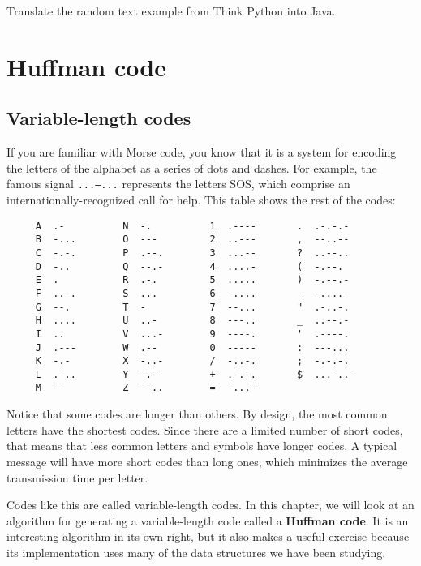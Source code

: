 Translate the random text example from Think Python into Java.


\chapter{Huffman code}
\label{huffman}

\section{Variable-length codes}

If you are familiar with Morse code, you know that it is a system
for encoding the letters of the alphabet as a series of dots and
dashes.  For example, the famous signal {\tt ...---...} represents
the letters SOS, which comprise an internationally-recognized call
for help.  This table shows the rest of the codes:

\begin{verbatim}
     A  .-          N  -.          1  .----       .  .-.-.-
     B  -...        O  ---         2  ..---       ,  --..--
     C  -.-.        P  .--.        3  ...--       ?  ..--..
     D  -..         Q  --.-        4  ....-       (  -.--.
     E  .           R  .-.         5  .....       )  -.--.-
     F  ..-.        S  ...         6  -....       -  -....-
     G  --.         T  -           7  --...       "  .-..-.
     H  ....        U  ..-         8  ---..       _  ..--.-
     I  ..          V  ...-        9  ----.       '  .----.
     J  .---        W  .--         0  -----       :  ---...
     K  -.-         X  -..-        /  -..-.       ;  -.-.-.
     L  .-..        Y  -.--        +  .-.-.       $  ...-..-
     M  --          Z  --..        =  -...-
\end{verbatim}


Notice that some codes are longer than others.  By design, the
most common letters have the shortest codes.  Since there are a
limited number of short codes, that means that less common
letters and symbols have longer codes.  A typical message will
have more short codes than long ones, which minimizes the average
transmission time per letter.


Codes like this are called variable-length codes.  In this chapter,
we will look at an algorithm for generating a variable-length code
called a {\bf Huffman code}.  It is an interesting algorithm in
its own right, but it also makes a useful exercise because its
implementation uses many of the data structures we have been studying.

